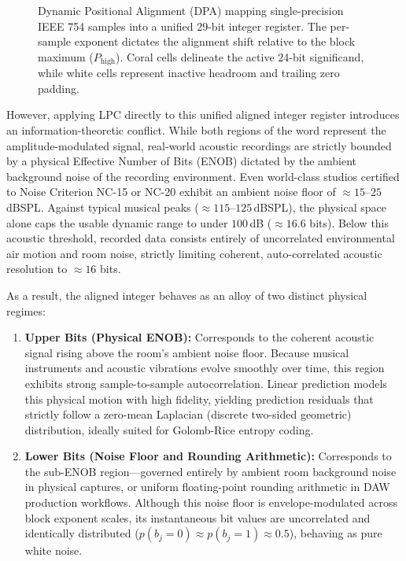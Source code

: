 \documentclass[10pt,twocolumn]{article}
\begin{document}
\begin{figure}[!ht]
{\begin{tikzpicture}[x=0.30cm, y=0.38cm]
		\end{tikzpicture}%
	}
	\caption{Dynamic Positional Alignment (DPA) mapping single-precision IEEE 754 samples into a unified 29-bit integer register. The per-sample exponent dictates the alignment shift relative to the block maximum ($P_{\text{high}}$). Coral cells delineate the active 24-bit significand, while white cells represent inactive headroom and trailing zero padding.}
	\label{fig:unified_alignment}
\end{figure}

However, applying LPC directly to this unified aligned integer register introduces an information-theoretic conflict. While both regions of the word represent the amplitude-modulated signal, real-world acoustic recordings are strictly bounded by a physical Effective Number of Bits (ENOB) dictated by the ambient background noise of the recording environment. Even world-class studios certified to Noise Criterion NC-15 or NC-20 exhibit an ambient noise floor of $\approx 15$--$25$\,dBSPL. Against typical musical peaks ($\approx 115$--$125$\,dBSPL), the physical space alone caps the usable dynamic range to under $100$\,dB ($\approx 16.6$ bits). Below this acoustic threshold, recorded data consists entirely of uncorrelated environmental air motion and room noise, strictly limiting coherent, auto-correlated acoustic resolution to $\approx 16$ bits.

As a result, the aligned integer behaves as an alloy of two distinct physical regimes:
\begin{enumerate}
	\item \textbf{Upper Bits (Physical ENOB):} Corresponds to the coherent acoustic signal rising above the room's ambient noise floor. Because musical instruments and acoustic vibrations evolve smoothly over time, this region exhibits strong sample-to-sample autocorrelation. Linear prediction models this physical motion with high fidelity, yielding prediction residuals that strictly follow a zero-mean Laplacian (discrete two-sided geometric) distribution, ideally suited for Golomb-Rice entropy coding.
	\item \textbf{Lower Bits (Noise Floor and Rounding Arithmetic):} Corresponds to the sub-ENOB region---governed entirely by ambient room background noise in physical captures, or uniform floating-point rounding arithmetic in DAW production workflows. Although this noise floor is envelope-modulated across block exponent scales, its instantaneous bit values are uncorrelated and identically distributed ($p(b_j = 0) \approx p(b_j = 1) \approx 0.5$), behaving as pure white noise.
\end{enumerate}
\end{document}
